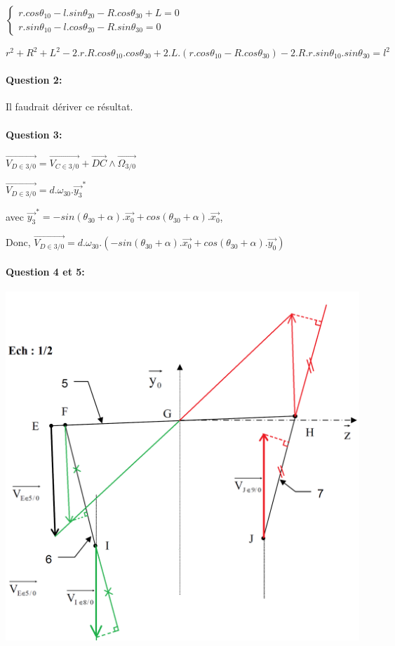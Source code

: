 $\left\{\begin{array}{l}
r.cos\theta_{10}-l.sin\theta_{20}-R.cos\theta_{30}+L=0 \\
r.sin\theta_{10}-l.cos\theta_{20}-R.sin\theta_{30}=0
\end{array}\right.$

$r^2+R^2+L^2-2.r.R.cos\theta_{10}.cos\theta_{30}+2.L.(r.cos\theta_{10}-R.cos\theta_{30})-2.R.r.sin\theta_{10}.sin\theta_{30}=l^2$

\paragraph{Question 2:} Il faudrait dériver ce résultat.

\paragraph{Question 3:} $\overrightarrow{V_{D\in 3/0}}=\overrightarrow{V_{C\in 3/0}}+\overrightarrow{DC}\wedge \overrightarrow{\Omega_{3/0}}$

$\overrightarrow{V_{D\in 3/0}}=d.\omega_{30}.\overrightarrow{y_3}^*$

avec $\overrightarrow{y_3}^*=-sin(\theta_{30}+\alpha).\overrightarrow{x_0}+cos(\theta_{30}+\alpha).\overrightarrow{x_0}$,

Donc, $\overrightarrow{V_{D\in 3/0}}=d.\omega_{30}.(-sin(\theta_{30}+\alpha).\overrightarrow{x_0}+cos(\theta_{30}+\alpha).\overrightarrow{y_0})$

\paragraph{Question 4 et 5:}

\begin{center}
 \includegraphics[width=0.8\linewidth]{img/chaudiere_cin_graph_cor}
\end{center}

